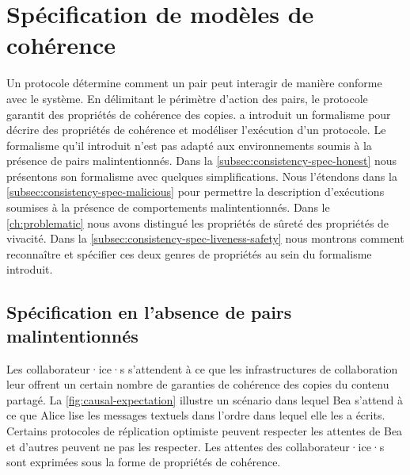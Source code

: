 \section{Spécification de modèles de cohérence}\label{sec:consistency-spec}

Un protocole détermine comment un pair peut interagir de manière conforme avec le système.
En délimitant le périmètre d'action des pairs, le protocole garantit des propriétés de cohérence des copies.
\textcite{burckhardt_eventualconsistency_2014} a introduit un formalisme pour décrire des propriétés de cohérence et modéliser l'exécution d'un protocole.
Le formalisme qu'il introduit n'est pas adapté aux environnements soumis à la présence de pairs malintentionnés.
Dans la \autoref{subsec:consistency-spec-honest} nous présentons son formalisme avec quelques simplifications.
Nous l'étendons dans la \autoref{subsec:consistency-spec-malicious} pour permettre la description d'exécutions soumises à la présence de comportements malintentionnés.
Dans le \autoref{ch:problematic} nous avons distingué les propriétés de sûreté des propriétés de vivacité.
Dans la \autoref{subsec:consistency-spec-liveness-safety} nous montrons comment reconnaître et spécifier ces deux genres de propriétés au sein du formalisme introduit.



\subsection{Spécification en l'absence de pairs malintentionnés}\label{subsec:consistency-spec-honest}

Les collaborateur·ice·s s'attendent à ce que les infrastructures de collaboration leur offrent un certain nombre de garanties de cohérence des copies du contenu partagé.
La \autoref{fig:causal-expectation} illustre un scénario dans lequel Bea s'attend à ce que Alice lise les messages textuels dans l'ordre dans lequel elle les a écrits.
Certains protocoles de réplication optimiste peuvent respecter les attentes de Bea et d'autres peuvent ne pas les respecter.
Les attentes des collaborateur·ice·s sont exprimées sous la forme de propriétés de cohérence.


